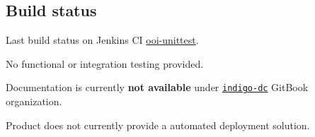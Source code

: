 \documentclass[a4wide,11pt]{article}
\begin{document}
\subsection{Build status}
Last build status on Jenkins CI \href{https://jenkins.indigo-datacloud.eu:8080//job/ooi-unittest/5}{ooi-unittest}.



\label{sec:func_int_test}
No functional or integration testing provided.



\label{sec:gitbook}
Documentation is currently \textbf{not available} under \href{https://www.gitbook.com/@indigo-dc/dashboard}{\texttt{indigo-dc}} GitBook organization.



\label{sec:configuration}
Product does not currently provide a automated deployment solution. 


\newpage

\end{document}

